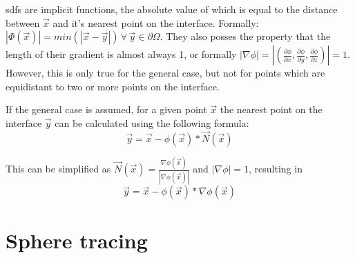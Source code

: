 \Glspl{sdf} are implicit functions, the absolute value of which is equal to the distance between $\vec{x}$ and it's nearest point on the interface. Formally:  $|\Phi(\vec{x})| = min(|\vec{x} - \vec{y}|) \, \forall \, \vec{y} \in \partial\Omega$. They also posses the property that the length of their gradient is almost always 1, or formally  $|\nabla\phi| = |(\frac{\partial\phi}{\partial x},\frac{\partial\phi}{\partial y},\frac{\partial\phi}{\partial z})| = 1$. However, this is only true for the general case, but not for points which are equidistant to two or more points on the interface.

If the general case is assumed, for a given point $\vec{x}$ the nearest point on the interface $\vec{y}$ can be calculated using the following formula:
$$\vec{y} = \vec{x} - \phi(\vec{x}) * \vec{N}(\vec{x}) $$

This can be simplified as  $\vec{N}(\vec{x}) = \frac{\nabla\phi(\vec{x})}{|\nabla\phi(\vec{x})|}$ and $|\nabla\phi| = 1$, resulting in 
$$\vec{y} = \vec{x} - \phi(\vec{x}) * \nabla\phi(\vec{x}) $$

\section{Sphere tracing}
\cite{hart:1996:sphere}









